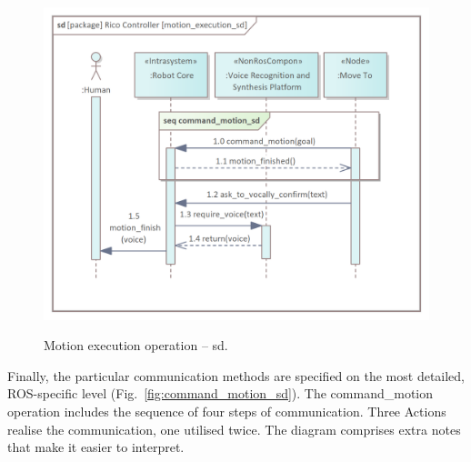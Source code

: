 \documentclass[11pt,oneside,a4paper]{article}
\begin{document}
	\begin{figure}[H]
		\centering
		\begin{center}
			{\includegraphics[scale=1.1]{img/rico_pkg/motion_execution_sd.png}}
		\end{center}
		\caption{Motion execution operation -- sd.} 
		\label{fig:motion_execution_sd}
	\end{figure}

\pagebreak


	Finally, the particular communication methods are specified on the most detailed, ROS-specific level (Fig.~\ref{fig:command_motion_sd}). The command\_motion operation includes the sequence of four steps of communication. Three Actions realise the communication, one utilised twice. The diagram comprises extra notes that make it easier to interpret.
	
\end{document}

